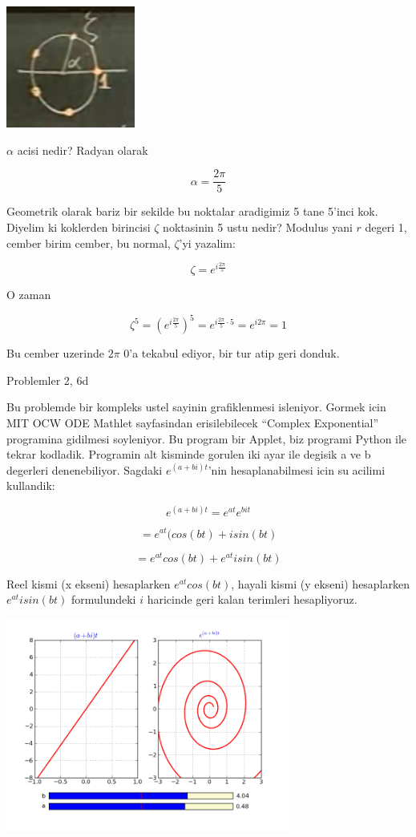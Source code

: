 \documentclass[12pt,fleqn]{article}
\begin{document}
\includegraphics[height=4cm]{6_5.png}

$\alpha$ acisi nedir? Radyan olarak 

\[ \alpha = \frac{2\pi}{5} \]

Geometrik olarak bariz bir sekilde bu noktalar aradigimiz 5 tane 5'inci
kok. Diyelim ki koklerden birincisi $\zeta$ noktasinin 5 ustu nedir?
Modulus yani $r$ degeri 1, cember birim cember, bu normal, $\zeta$'yi yazalim:

\[ \zeta = e^{i\frac{2\pi}{5}} \]

O zaman

\[ 
\zeta^5 = (e^{i\frac{2\pi}{5}})^5 = e^{i\frac{2\pi}{5} \cdot 5} = e^{i2\pi} =
1 
\]

Bu cember uzerinde $2\pi$ 0'a tekabul ediyor, bir tur atip geri donduk. 

Problemler 2, 6d

Bu problemde bir kompleks ustel sayinin grafiklenmesi isleniyor. Gormek
icin MIT OCW ODE Mathlet sayfasindan erisilebilecek ``Complex Exponential''
programina gidilmesi soyleniyor. Bu program bir Applet, biz programi Python
ile tekrar kodladik. Programin alt kisminde gorulen iki ayar ile degisik a
ve b degerleri denenebiliyor. Sagdaki $e^{(a+bi)t}$'nin hesaplanabilmesi
icin su acilimi kullandik:

\[ e^{(a+bi)t} = e^{at} e^{bit}\]

\[ = e^{at} (cos(bt) + isin(bt) \]

\[ = e^{at}cos(bt) + e^{at} isin(bt) \]

Reel kismi (x ekseni) hesaplarken $e^{at}cos(bt)$, hayali kismi (y ekseni)
hesaplarken $e^{at} isin(bt)$ formulundeki $i$ haricinde geri kalan terimleri
hesapliyoruz.



\includegraphics[height=7cm]{compexp.png}
\end{document}
